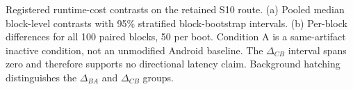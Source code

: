 \caption{Registered runtime-cost contrasts on the retained S10 route. (a) Pooled median block-level contrasts with 95\% stratified block-bootstrap intervals. (b) Per-block differences for all 100 paired blocks, 50 per boot. Condition A is a same-artifact inactive condition, not an unmodified Android baseline. The $\Delta_{CB}$ interval spans zero and therefore supports no directional latency claim. Background hatching distinguishes the $\Delta_{BA}$ and $\Delta_{CB}$ groups.}
